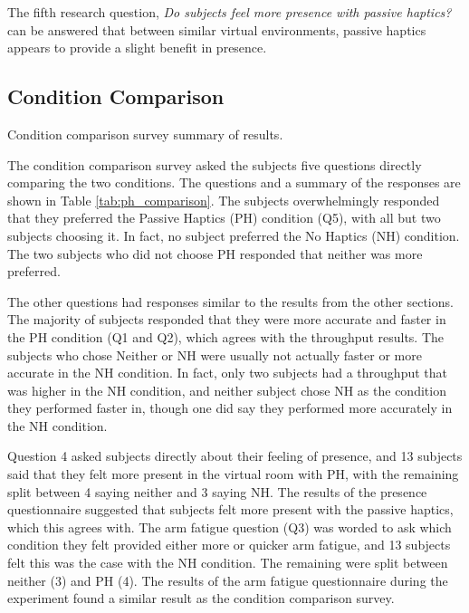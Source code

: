 The fifth research question, \emph{Do subjects feel more presence with passive haptics?} can be answered that between similar virtual environments, passive haptics appears to provide a slight benefit in presence.

\subsection{Condition Comparison}

\begin{table}
    \centering
    \caption{Condition comparison survey summary of results.}
    \label{tab:ph_comparison}
\end{table}

The condition comparison survey asked the subjects five questions directly comparing the two conditions.
The questions and a summary of the responses are shown in Table \ref{tab:ph_comparison}.
The subjects overwhelmingly responded that they preferred the Passive Haptics (PH) condition (Q5), with all but two subjects choosing it.
In fact, no subject preferred the No Haptics (NH) condition.
The two subjects who did not choose PH responded that neither was more preferred.

The other questions had responses similar to the results from the other sections.
The majority of subjects responded that they were more accurate and faster in the PH condition (Q1 and Q2), which agrees with the throughput results.
The subjects who chose Neither or NH were usually not actually faster or more accurate in the NH condition.
In fact, only two subjects had a throughput that was higher in the NH condition, and neither subject chose NH as the condition they performed faster in, though one did say they performed more accurately in the NH condition.

Question 4 asked subjects directly about their feeling of presence, and 13 subjects said that they felt more present in the virtual room with PH, with the remaining split between 4 saying neither and 3 saying NH.
The results of the presence questionnaire suggested that subjects felt more present with the passive haptics, which this agrees with.
The arm fatigue question (Q3) was worded to ask which condition they felt provided either more or quicker arm fatigue, and 13 subjects felt this was the case with the NH condition.
The remaining were split between neither (3) and PH (4).
The results of the arm fatigue questionnaire during the experiment found a similar result as the condition comparison survey.

